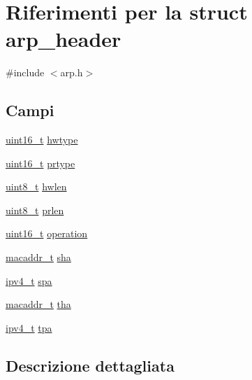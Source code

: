 \hypertarget{structarp__header}{\section{Riferimenti per la struct arp\+\_\+header}
\label{structarp__header}
}


{\ttfamily \#include $<$arp.\+h$>$}

\subsection*{Campi}
\begin{DoxyCompactItemize}
\item 
\hyperlink{aplus_8h_a5a8b2dc9e45a9ee81a94ef304fb62505}{uint16\+\_\+t} \hyperlink{structarp__header_a571cbbe11fab087a17240660f28c19b9}{hwtype}
\item 
\hyperlink{aplus_8h_a5a8b2dc9e45a9ee81a94ef304fb62505}{uint16\+\_\+t} \hyperlink{structarp__header_aa1b4067ef393ffcada7937d04546570e}{prtype}
\item 
\hyperlink{aplus_8h_ae0430369c5a35dcdbc0bc19dcbb33a03}{uint8\+\_\+t} \hyperlink{structarp__header_ad11b0f96095d8f44e6b21aaa3938df1f}{hwlen}
\item 
\hyperlink{aplus_8h_ae0430369c5a35dcdbc0bc19dcbb33a03}{uint8\+\_\+t} \hyperlink{structarp__header_a9188068c8427afd6f989e98e37a6c9ce}{prlen}
\item 
\hyperlink{aplus_8h_a5a8b2dc9e45a9ee81a94ef304fb62505}{uint16\+\_\+t} \hyperlink{structarp__header_a115cbc3f70bdcb71f36ed74a02ce585f}{operation}
\item 
\hyperlink{netif_8h_a95d524a06a1ff12a314f88bac04db658}{macaddr\+\_\+t} \hyperlink{structarp__header_a1e1ad1e3d78b390d8f31b83cc2d48adc}{sha}
\item 
\hyperlink{netif_8h_aea29db0d4ae23303ff7591af75c7b74a}{ipv4\+\_\+t} \hyperlink{structarp__header_a339356e9ca215db53a3491288ffac730}{spa}
\item 
\hyperlink{netif_8h_a95d524a06a1ff12a314f88bac04db658}{macaddr\+\_\+t} \hyperlink{structarp__header_a013af95c55ed102d198feeab64ce45ee}{tha}
\item 
\hyperlink{netif_8h_aea29db0d4ae23303ff7591af75c7b74a}{ipv4\+\_\+t} \hyperlink{structarp__header_aedc5d2cdff377ab3192ed264d060e914}{tpa}
\end{DoxyCompactItemize}


\subsection{Descrizione dettagliata}


